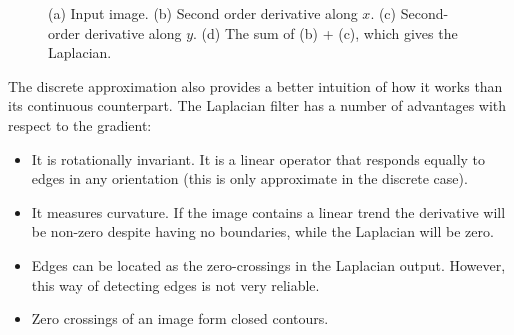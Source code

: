 \begin{figure}[h]
\centerline{
}
\caption{(a) Input image. (b) Second order derivative along $x$. (c) Second-order derivative along $y$. (d) The sum of (b) + (c), which gives the Laplacian.} 
\label{fig:wheellaplacian}
\end{figure}




The discrete approximation also provides a better intuition of how it works than its continuous counterpart. The Laplacian filter has a number of advantages with respect to the gradient:
\begin{itemize}
\item It is rotationally invariant. It is a linear operator that responds equally to edges in any orientation (this is only approximate in the discrete case). 
\item It measures curvature. If the image contains a linear trend the derivative will be non-zero despite having no boundaries, while the Laplacian will be zero. 
\item Edges can be located as the zero-crossings in the Laplacian output. However, this way of detecting edges is not very reliable.
\item Zero crossings of an image form closed contours.
\end{itemize}


